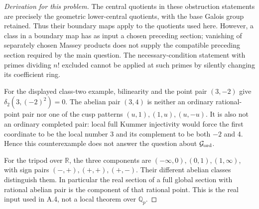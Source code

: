 \begin{proof}[Derivation for this problem]
The central quotients in these obstruction statements are precisely the
geometric lower-central quotients, with the base Galois group retained.
Thus their boundary maps apply to the quotients used here. However, a class
in a boundary map has as input a chosen preceding section; vanishing of
separately chosen Massey products does not supply the compatible preceding
section required by the main question. The necessary-condition statement
with primes dividing \(n!\) excluded cannot be applied at such primes by
silently changing its coefficient ring.

For the displayed class-two example, bilinearity and the point pair
\((3,-2)\) give \(\delta_2(3,(-2)^2)=0\).
The abelian pair \((3,4)\) is neither an ordinary rational-point pair nor
one of the cusp patterns \((u,1),(1,u),(u,-u)\). It is also not an
ordinary completed pair: local full Kummer injectivity would force the
first coordinate to be the local number 3 and its complement to be both
\(-2\) and 4. Hence this counterexample does not answer the question
about \(\mathcal G_{\rm ord}\).

For the tripod over \(\mathbb R\), the three components are
\(( -\infty,0),(0,1),(1,\infty)\), with sign pairs
\((-,+),(+,+),(+,-)\). Their different abelian classes distinguish
them. In particular the real section of a full global section with rational
abelian pair is the component of that rational point. This is the real
input used in A.4, not a local theorem over \(\mathbb Q_p\).
\end{proof}

